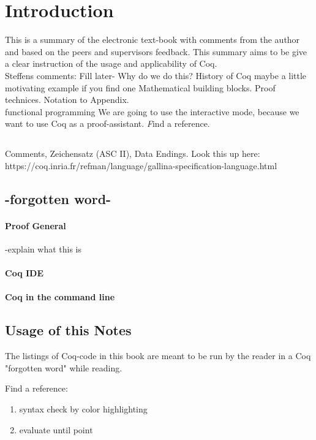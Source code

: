 \section{Introduction}


This is a summary of the electronic text-book \cite{PACGGHSY} with comments from the author and based on the peers and supervisors feedback.
This summary aims to be give a clear instruction of the usage and applicability of Coq.\\

    

Steffens comments:
Fill later-
 Why do we do this?
 History of Coq
 maybe a little motivating example if you find one
 Mathematical building blocks. Proof technices. Notation to Appendix.\\
 \gls{functional programming}
We are going to use the interactive mode, because we want to use Coq as a proof-assistant. {\emph Find a reference.}

\subsection{}

Comments, Zeichensatz (ASC II), Data Endings.
Look this up here:\\
https://coq.inria.fr/refman/language/gallina-specification-language.html
\subsection{-forgotten word-}



\paragraph{Proof General}
-explain what this is


\paragraph{Coq IDE}

\paragraph{Coq in the command line}




\subsection{Usage of this Notes}


The listings of Coq-code in this book are meant to be run by the reader in a Coq "forgotten word" while reading.

Find a reference:
\begin{enumerate}
\item syntax check by color highlighting
\item evaluate until point
\end{enumerate}




